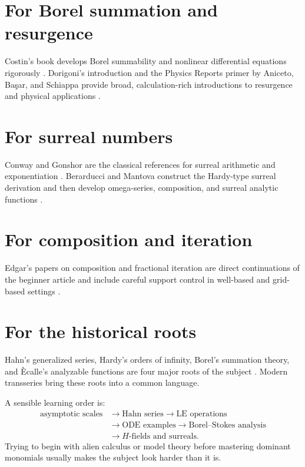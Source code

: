 \documentclass[11pt,openany]{book}
\theoremstyle{plain}
\theoremstyle{definition}
\theoremstyle{remark}
\begin{document}
\section{For Borel summation and resurgence}
Costin's book develops Borel summability and nonlinear differential equations rigorously \cite{Costin2009}. Dorigoni's introduction and the Physics Reports primer by Aniceto, Ba\c{s}ar, and Schiappa provide broad, calculation-rich introductions to resurgence and physical applications \cite{Dorigoni2019,ABS2019}.

\section{For surreal numbers}
Conway and Gonshor are the classical references for surreal arithmetic and exponentiation \cite{Conway1976,Gonshor1986}. Berarducci and Mantova construct the Hardy-type surreal derivation and then develop omega-series, composition, and surreal analytic functions \cite{BM2018,BM2019}.

\section{For composition and iteration}
Edgar's papers on composition and fractional iteration are direct continuations of the beginner article and include careful support control in well-based and grid-based settings \cite{EdgarComposition,EdgarFractional}.

\section{For the historical roots}
Hahn's generalized series, Hardy's orders of infinity, Borel's summation theory, and \`Ecalle's analyzable functions are four major roots of the subject \cite{Hahn1907,Hardy1910,Borel1899,Ecalle1992}. Modern transseries bring these roots into a common language.

\begin{checkpointbox}
A sensible learning order is:
\[
\begin{aligned}
 \text{asymptotic scales}
 &\longrightarrow \text{Hahn series}
 \longrightarrow \text{LE operations}\\
 &\longrightarrow \text{ODE examples}
 \longrightarrow \text{Borel--Stokes analysis}\\
 &\longrightarrow \text{$H$-fields and surreals}.
\end{aligned}
\]
Trying to begin with alien calculus or model theory before mastering dominant monomials usually makes the subject look harder than it is.
\end{checkpointbox}
\end{document}
